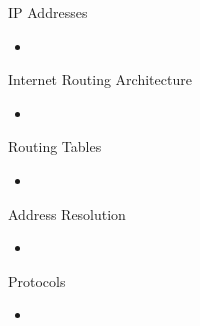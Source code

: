 \documentclass{beamer}
\begin{document}
\begin{frame}{IP Addresses}

\begin{itemize}
\item
\end{itemize}

\end{frame}

\begin{frame}{Internet Routing Architecture}

\begin{itemize}
\item
\end{itemize}

\end{frame}

\begin{frame}{Routing Tables}

\begin{itemize}
\item
\end{itemize}

\end{frame}

\begin{frame}{Address Resolution}

\begin{itemize}
\item
\end{itemize}

\end{frame}

\begin{frame}{Protocols}

\begin{itemize}
\item
\end{itemize}

\end{frame}
\end{document}
